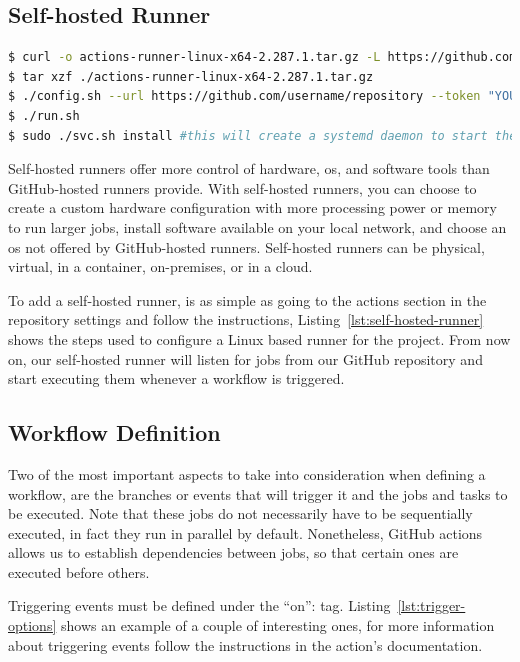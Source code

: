 \newpage
\subsection{Self-hosted Runner}

\begin{lstlisting}[language=bash, caption=Set up Self-hosted Runner,label={lst:self-hosted-runner}]
$ curl -o actions-runner-linux-x64-2.287.1.tar.gz -L https://github.com/actions/runner/releases/download/v2.287.1/actions-runner-linux-x64-2.287.1.tar.gz
$ tar xzf ./actions-runner-linux-x64-2.287.1.tar.gz
$ ./config.sh --url https://github.com/username/repository --token "YOUR TOKEN"
$ ./run.sh
$ sudo ./svc.sh install #this will create a systemd daemon to start the runner on start up
\end{lstlisting}

Self-hosted runners offer more control of hardware, \gls{os}, and software tools than GitHub-hosted runners provide. With self-hosted runners, you can choose to create a custom hardware configuration with more processing power or memory to run larger jobs, install software available on your local network, and choose an \gls{os} not offered by GitHub-hosted runners. Self-hosted runners can be physical, virtual, in a container, on-premises, or in a cloud.

To add a self-hosted runner, is as simple as going to the actions section in the repository settings and follow the instructions, Listing~\ref{lst:self-hosted-runner} shows the steps used to configure a Linux based runner for the project. From now on, our self-hosted runner will listen for jobs from our GitHub repository and start executing them whenever a workflow is triggered.

\subsection{Workflow Definition}

Two of the most important aspects to take into consideration when defining a workflow, are the branches or events that will trigger it and the jobs and tasks to be executed. Note that these jobs do not necessarily have to be sequentially executed, in fact they run in parallel by default. Nonetheless, GitHub actions allows us to establish dependencies between jobs, so that certain ones are executed before others.

Triggering events must be defined under the \enquote{on}: tag. Listing~\ref{lst:trigger-options} shows an example of a couple of interesting ones, for more information about triggering events follow the instructions in the action's documentation.

